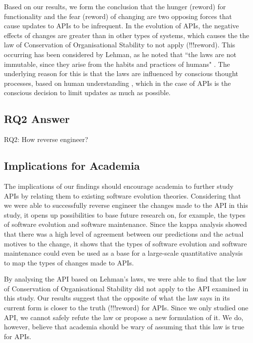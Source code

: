 \documentclass{sig-alternate}
\begin{document}
Based on our results, we form the conclusion that the hunger (reword) for functionality and the fear (reword) of changing are two opposing forces that cause updates to APIs to be infrequent. In the evolution of APIs, the negative effects of changes are greater than in other types of systems, which causes the the law of Conservation of Organisational Stability to not apply (!!!reword). This occurring has been considered by Lehman, as he noted that ``the laws are not immutable, since they arise from the habits and practices of humans" \cite{lehman1980programs}. The underlying reason for this is that the laws are influenced by conscious thought processes, based on human understanding \cite{lehman1980understanding}, which in the case of APIs is the conscious decision to limit updates as much as possible. 




\subsection{RQ2 Answer}
RQ2: How reverse engineer?








\subsection{Implications for Academia} 
The implications of our findings should encourage academia to further study APIs by relating them to existing software evolution theories. Considering that we were able to successfully reverse engineer the changes made to the API in this study, it opens up possibilities to base future research on, for example, the types of software evolution and software maintenance. Since the kappa analysis showed that there was a high level of agreement between our predictions and the actual motives to the change, it shows that the types of software evolution and software maintenance could even be used as a base for a large-scale quantitative analysis to map the types of changes made to APIs. 

By analysing the API based on Lehman's laws, we were able to find that the law of Conservation of Organisational Stability did not apply to the API examined in this study. Our results suggest that the opposite of what the law says in its current form is closer to the truth (!!!reword) for APIs. Since we only studied one API, we cannot safely refute the law or propose a new formulation of it. We do, however, believe that academia should be wary of assuming that this law is true for APIs. 
\end{document}
